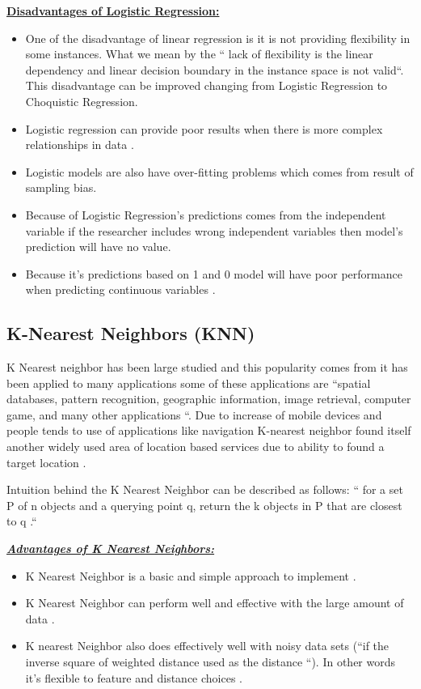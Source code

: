 \documentclass[sigconf]{acmart}
\begin{document}
\textbf{\underline{Disadvantages of Logistic Regression:}}

\begin{itemize}
\item One of the disadvantage of linear regression is it is not providing flexibility in some instances. What we mean by the `` lack of flexibility is the linear dependency and linear decision boundary in the instance space is not valid\cite{www-old.cs}``. This disadvantage can be improved changing from Logistic Regression to Choquistic Regression\cite{www-old.cs}.
\item Logistic regression can provide poor results when there is more complex relationships in data \cite{www-elitedatascience}.
\item Logistic models are also have over-fitting problems which comes from result of sampling bias\cite{www-classroom}.
\item Because of Logistic Regression's predictions comes from the independent variable if the researcher includes wrong independent variables then model's prediction will have no value\cite{www-classroom}.
\item Because it's predictions based on 1 and 0 model will have poor performance when predicting continuous variables \cite{www-classroom}. 
\end{itemize}


\subsection{K-Nearest Neighbors (KNN)}
K Nearest neighbor has been large studied and this popularity comes from it has been applied to many applications some of these applications are ``spatial databases, pattern recognition, geographic information, image retrieval, computer game, and many other applications \cite{Lee2017-knn}``. Due to increase of mobile devices and people tends to use of applications like navigation K-nearest neighbor found itself another widely used area of location based services due to ability to found a target location \cite{Lee2017-knn}. 

\par Intuition behind the K Nearest Neighbor can be described as follows: `` for a set P of n objects and a querying point q, return the k objects in P that are closest to q \cite{Lee2017-knn}.``


\textbf{\underline{\textit{Advantages of K Nearest Neighbors:}}}
\begin{itemize}
\item K Nearest Neighbor is a basic and simple approach to implement \cite{www-cs.man}.
\item K Nearest Neighbor can perform well and effective with the large amount of data \cite{www-revoledu}.
\item K nearest Neighbor also does effectively well with noisy data sets (``if the inverse square of weighted distance used as the distance \cite{www-revoledu}``). In other words it's flexible to feature and distance choices \cite{www-cs.man}.
\end{itemize}
\end{document}
